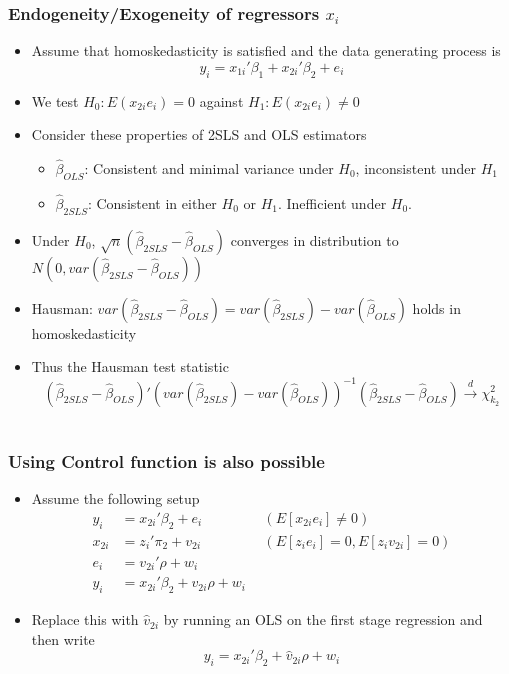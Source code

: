\documentclass[aspectratio=169]{beamer}
\begin{document}
\begin{frame}
\frametitle{Endogeneity/Exogeneity of regressors $x_i$}
\begin{itemize}
\item Assume that homoskedasticity is satisfied and the data generating process is
\[
y_i = x_{1i}'\beta_1 + x_{2i}'\beta_2+e_i
\]
\item We test $H_0: E(x_{2i}e_i)=0$ against $H_1:E(x_{2i}e_i)\neq0$
\item Consider these properties of 2SLS and OLS estimators
\begin{itemize}
\item $\hat{\beta}_{OLS}$: Consistent and minimal variance under $H_0$, inconsistent under $H_1$
\item $\hat{\beta}_{2SLS}$:  Consistent in either $H_0$ or $H_1$. Inefficient under $H_0$. 
\end{itemize}
\item Under $H_0$, $\sqrt{n}(\hat{\beta}_{2SLS}-\hat{\beta}_{OLS})$ converges in distribution to $N(0, var(\hat{\beta}_{2SLS}-\hat{\beta}_{OLS}))$
\item Hausman: $var(\hat{\beta}_{2SLS}-\hat{\beta}_{OLS})=var(\hat{\beta}_{2SLS})-var(\hat{\beta}_{OLS})$ holds in homoskedasticity
\item Thus the Hausman test statistic
\[
(\hat{\beta}_{2SLS}-\hat{\beta}_{OLS})'(var(\hat{\beta}_{2SLS})-var(\hat{\beta}_{OLS}))^{-1}(\hat{\beta}_{2SLS}-\hat{\beta}_{OLS})\xrightarrow{d}\chi_{k_2}^2
\]\
\end{itemize}
\end{frame}


\begin{frame}
\frametitle{Using Control function is also possible}
\begin{itemize}
\item  Assume the following setup
\[
\begin{aligned}
y_i &= x_{2i}'\beta_2+e_i& \ \ (E[x_{2i}e_i]\neq0) \\
x_{2i}&=z_i'\pi_2 + v_{2i}& \ \ (E[z_ie_i]=0, E[z_iv_{2i}]=0)\\
e_i &=v_{2i}'\rho + w_i&\\
y_i &= x_{2i}'\beta_2+v_{2i}\rho + w_i
\end{aligned}
\]
\item Replace this with $\hat{v}_{2i}$ by running an OLS on the first stage regression and then write
\[
y_i = x_{2i}'\beta_2+\hat{v}_{2i}\rho + w_i
\]
\end{itemize}
\end{frame}
\end{document}
